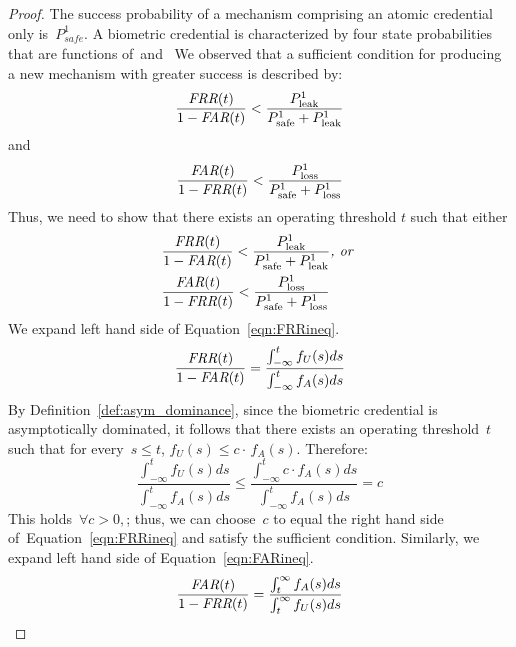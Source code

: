\documentclass[conference,compsoc]{IEEEtran}
\begin{document}
\begin{proof}
The success probability of a mechanism comprising an atomic credential only is~$P^{1}_\textit{safe}$. A biometric credential is characterized by four state probabilities that are functions of~\FAR and~\FRR
\contprobabilities
We observed that a sufficient condition for producing a new mechanism with greater success is described by:
\begin{equation}\label{eqn:FRRineq}
\frac{\textit{FRR}(t)}{1-\textit{FAR}(t)} < \frac{P^{1}_{\text{leak}}}{P^{1}_{\text{safe}}+P^{1}_{\text{leak}}}
\end{equation}
and
\begin{equation}\label{eqn:FARineq}
    \frac{\textit{FAR}(t)}{1-\textit{FRR}(t)} < \frac{P^{1}_{\text{loss}}}{P^{1}_{\text{safe}}+P^{1}_{\text{loss}}}
\end{equation}
Thus, we need to show that there exists an operating threshold $t$ such that either
\begin{equation*}
    \begin{aligned}
    &\frac{\textit{FRR}(t)}{1-\textit{FAR}(t)} < \frac{P^{1}_{\text{leak}}}{P^{1}_{\text{safe}}+P^{1}_{\text{leak}}} \textit{, or } \\
    &\frac{\textit{FAR}(t)}{1-\textit{FRR}(t)} < \frac{P^{1}_{\text{loss}}}{P^{1}_{\text{safe}}+P^{1}_{\text{loss}}}
    \end{aligned}
\end{equation*}
We expand left hand side of Equation~\ref{eqn:FRRineq}. 
\begin{equation*}
\frac{\textit{FRR}(t)}{1-\textit{FAR}(t)} = \frac{\int_{-\infty}^{t} f_U(s) ds}{\int_{-\infty}^{t} f_A(s) ds}
\end{equation*}
By Definition~\ref{def:asym_dominance}, since the biometric credential is asymptotically dominated, it follows that there exists an operating threshold~$t$ such that for every~$s \le t$, $f_U(s) \le c\cdot\,f_A(s)$. Therefore:
\begin{equation*}
\frac{\int_{-\infty}^{t} f_U(s) ds}{\int_{-\infty}^{t} f_A(s) ds} \le \frac{\int_{-\infty}^{t} c \cdot f_A(s) ds}{\int_{-\infty}^{t} f_A(s) ds} = c
\end{equation*}
This holds~$\forall c > 0,$; thus, we can choose~$c$ to equal the right hand side of~Equation~\ref{eqn:FRRineq} and satisfy the sufficient condition.
Similarly, we expand left hand side of Equation~\ref{eqn:FARineq}. 
\begin{equation*}
\frac{\textit{FAR}(t)}{1-\textit{FRR}(t)} = \frac{\int_{t}^{\infty} f_A(s) ds}{\int_{t}^{\infty} f_U(s) ds}
\end{equation*}

\end{proof}
\end{document}
